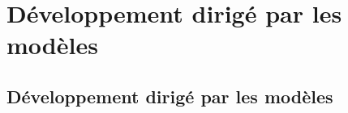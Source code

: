\part{D\'eveloppement dirig\'e par les mod\`eles}
\chapter{D\'eveloppement dirig\'e par les mod\`eles}\label{chap:dev}



\newpage


\newpage


\newpage


\newpage


\newpage


\newpage


\newpage


\newpage

